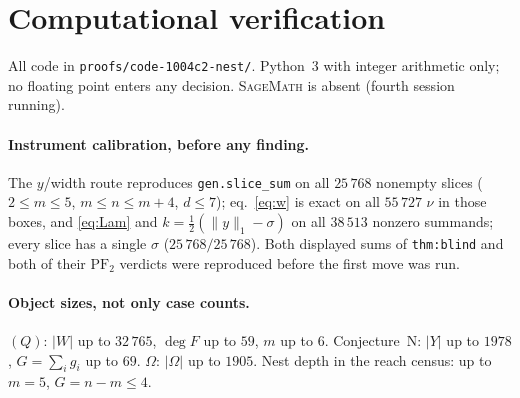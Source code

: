 \documentclass[11pt]{article}
\theoremstyle{plain}
\theoremstyle{definition}
\newcommand{\PFtwo}{\mathrm{PF}_2}
\begin{document}
\section{Computational verification}\label{sec:verif}

All code in \texttt{proofs/code-1004c2-nest/}. Python~3 with integer arithmetic only; no
floating point enters any decision. \textsc{SageMath} is absent (fourth session running).

\paragraph{Instrument calibration, before any finding.}
The $y$/width route reproduces \texttt{gen.slice\_sum} on all $25\,768$ nonempty slices
($2\le m\le5$, $m\le n\le m+4$, $d\le7$); eq.~\eqref{eq:w} is exact on all $55\,727$
$\nu$ in those boxes, and \eqref{eq:Lam} and $k=\tfrac12(\|y\|_1-\sigma)$ on all $38\,513$
nonzero summands; every slice has a single $\sigma$ ($25\,768/25\,768$). Both displayed
sums of \texttt{thm:blind} and both of their $\PFtwo$ verdicts were reproduced
before the first move was run.

\paragraph{Object sizes, not only case counts.} $(Q)$: $|W|$ up to $32\,765$, $\deg F$ up
to $59$, $m$ up to $6$. Conjecture~N: $|Y|$ up to $1978$, $G=\sum_ig_i$ up to $69$.
$\Omega$: $|\Omega|$ up to $1905$. Nest depth in the reach census: up to $m=5$,
$G=n-m\le4$.
\end{document}
